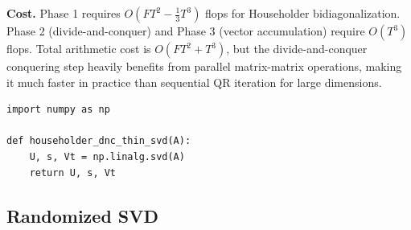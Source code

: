 \documentclass[11pt,a4paper]{article}
\theoremstyle{plain}
\theoremstyle{definition}
\theoremstyle{remark}
\begin{document}
%
%
%
%
%
%
%
%
%
%
%
%
%
%
%

\medskip\noindent\textbf{Cost.} Phase 1 requires $O(FT^2 - \frac{1}{3}T^3)$
flops for Householder bidiagonalization.
Phase 2 (divide-and-conquer) and Phase 3 (vector accumulation) require $O(T^3)$ flops.
Total arithmetic cost is $O(FT^2 + T^3)$, but the divide-and-conquer conquering
step heavily benefits from parallel matrix-matrix operations,
making it much faster in practice than sequential QR iteration for large dimensions.

\begin{lstlisting}[caption={Singular Value Decomposition in NumPy.},label={lst:power}]
import numpy as np

def householder_dnc_thin_svd(A):
    U, s, Vt = np.linalg.svd(A)
    return U, s, Vt
\end{lstlisting}

\subsection{Randomized SVD}
\end{document}
